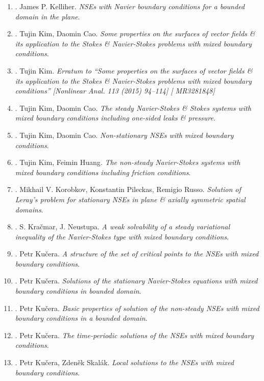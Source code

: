 \documentclass{article}
\begin{document}
\begin{enumerate}
	\item \cite{Kelliher2006}. {\sc James P. Kelliher}. {\it NSEs with Navier boundary conditions for a bounded domain in the plane}.
	\item \cite{Kim_Cao2015}. {\sc Tujin Kim, Daomin Cao}. {\it Some properties on the surfaces of vector fields \& its application to the Stokes \& Navier-Stokes problems with mixed boundary conditions}.
	\item \cite{Kim2016}. {\sc Tujin Kim}. {\it Erratum to ``Some properties on the surfaces of vector fields \& its application to the Stokes \& Navier-Stokes problems with mixed boundary conditions'' [{N}onlinear {A}nal. 113 (2015) 94--114] [ {MR}3281848]}
	\item \cite{Kim_Cao2016}. {\sc Tujin Kim, Daomin Cao}. {\it The steady {N}avier-{S}tokes \& Stokes systems with mixed boundary conditions including one-sided leaks \& pressure}.
	\item \cite{Kim_Cao2017}. {\sc Tujin Kim, Daomin Cao}. {\it Non-stationary NSEs with mixed boundary conditions}.
	\item \cite{Kim_Huang2018}. {\sc Tujin Kim, Feimin Huang}. {\it The non-steady Navier-Stokes systems with mixed boundary conditions including friction conditions}.
	\item \cite{Korobkov_Pileckas_Russo2015}. {\sc Mikhail V. Korobkov, Konstantin Pileckas, Remigio Russo}. {\it Solution of Leray's problem for stationary NSEs in plane \& axially symmetric spatial domains}.
	\item \cite{Kracmar_Neustupa2001}. {\sc S. Kra\v{c}mar, J. Neustupa}. {\it A weak solvability of a steady variational inequality of the Navier-Stokes type with mixed boundary conditions}.
	\item \cite{Kucera1998a}. {\sc Petr Ku\v{c}era}. {\it A structure of the set of critical points to the NSEs with mixed boundary conditions}.
	\item \cite{Kucera1998b}. {\sc Petr Ku\v{c}era}. {\it Solutions of the stationary Navier-Stokes equations with mixed boundary conditions in bounded domain}.
	\item \cite{Kucera2009}. {\sc Petr Ku\v{c}era}. {\it Basic properties of solution of the non-steady NSEs with mixed boundary conditions in a bounded domain}.
	\item \cite{Kucera2010}. {\sc Petr Ku\v{c}era}. {\it The time-periodic solutions of the NSEs with mixed boundary conditions}.
	\item \cite{Kucera_Skalak1998}. {\sc Petr Ku\v{c}era, Zden\v{e}k Skal\'{a}k}. {\it Local solutions to the NSEs with mixed boundary conditions}.

\end{enumerate}
\end{document}
